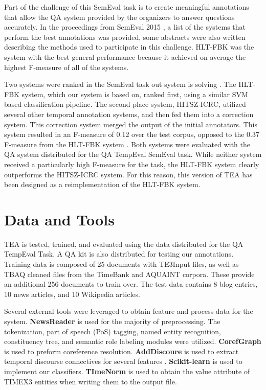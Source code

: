 \documentclass[11pt,letterpaper]{article}
\begin{document}
Part of the challenge of this SemEval task is to create meaningful annotations that allow the QA system provided by the organizers to answer questions accurately. In the proceedings from SemEval 2015 \cite{Llorens:16}, a list of the systems that perform the best annotations was provided, some abstracts were also written describing the methods used to participate in this challenge. HLT-FBK was the system with the best general performance because it achieved on average the highest F-measure of all of the systems.

Two systems were ranked in the SemEval task out system is solving \cite{Llorens:16}. The HLT-FBK system, which our system is based on, ranked first, using a similar SVM based classification pipeline. The second place system, HITSZ-ICRC, utilized several other temporal annotation systems, and then fed them into a correction system. This correction system merged the output of the initial annotators. This system resulted in an F-measure of 0.12 over the test corpus, opposed to the 0.37 F-measure from the HLT-FBK system \cite{Llorens:16}. Both systems were evaluated with the QA system distributed for the QA TempEval SemEval task. While neither system received a particularly high F-measure for the task, the HLT-FBK system clearly outperforms the HITSZ-ICRC system. For this reason, this version of TEA has been designed as a reimplementation of the HLT-FBK system. 


\section{Data and Tools}

TEA is tested, trained, and evaluated using the data distributed for the QA TempEval Task. A QA kit is also distributed for testing our annotations. Training data is composed of 25 documents with TE3Input files, as well as TBAQ cleaned files from the TimeBank and AQUAINT corpora. These provide an additional 256 documents to train over. The test data contains 8 blog entries, 10 news articles, and 10 Wikipedia articles.

Several external tools were leveraged to obtain feature and process data for the system. \textbf{NewsReader} is used for the majority of preprocessing. The tokenization, part of speech (PoS) tagging, named entity recognition, constituency tree, and semantic role labeling modules were utilized. \textbf{CorefGraph} is used to preform coreference resolution. \textbf{AddDiscoure} is used to extract temporal discourse connectives for several features \cite{Pitler:09}. \textbf{Scikit-learn} is used to implement our classifiers. \textbf{TImeNorm} is used to obtain the value attribute of TIMEX3 entities when writing them to the output file.
\end{document}
